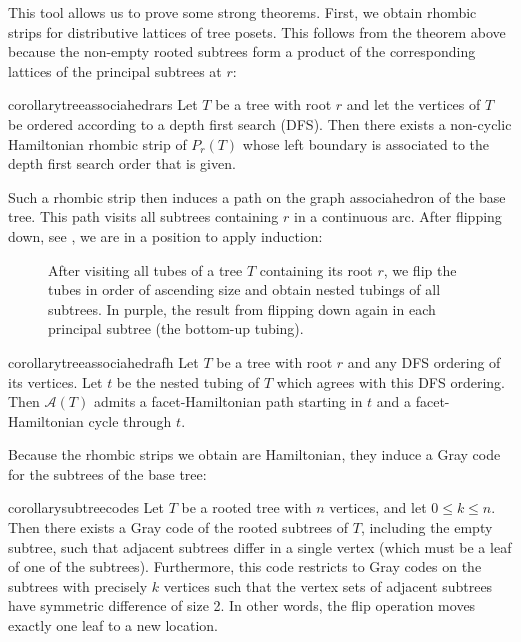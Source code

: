 \documentclass[fontsize=11pt,a4paper,DIV=12]{scrartcl}
\begin{document}
This tool allows us to prove some strong theorems. First, we obtain rhombic strips for distributive lattices of tree posets. This follows from the theorem above because the non-empty rooted subtrees form a product of the corresponding lattices of the principal subtrees at $r$:

\begin{restatable}{corollary}{treeassociahedrars}\label{thm:tree associahedra rs}
	Let $T$ be a tree with root $r$ and let the vertices of $T$ be ordered according to a depth first search (DFS). Then there exists a non-cyclic Hamiltonian rhombic strip of $P_r(T)$ whose left boundary is associated to the depth first search order that is given.
\end{restatable}

Such a rhombic strip then induces a path on the graph associahedron of the base tree. This path visits all subtrees containing $r$ in a continuous arc. After flipping down, see , we are in a position to apply induction:

\begin{figure}
	\centering
	
	\caption{After visiting all tubes of a tree $T$ containing its root $r$, we flip the tubes in order of ascending size and obtain nested tubings of all subtrees. In purple, the result from flipping down again in each principal subtree (the bottom-up tubing).}
	\label{fig:tree flipping down}
\end{figure}

\begin{restatable}{corollary}{treeassociahedrafh}\label{thm:tree associahedra fh}
	Let $T$ be a tree with root $r$ and any DFS ordering of its vertices. Let $t$ be the nested tubing of $T$ which agrees with this DFS ordering. Then $\mathcal{A}(T)$ admits a facet-Hamiltonian path starting in $t$ and a facet-Hamiltonian cycle through $t$.
\end{restatable}

Because the rhombic strips we obtain are Hamiltonian, they induce a Gray code for the subtrees of the base tree:

\begin{restatable}{corollary}{subtreecodes}\label{thm:subtree gray code}
	Let $T$ be a rooted tree with $n$ vertices, and let $0\le k\le n$. Then there exists a Gray code of the rooted subtrees of $T$, including the empty subtree, such that adjacent subtrees differ in a single vertex (which must be a leaf of one of the subtrees). Furthermore, this code restricts to Gray codes on the subtrees with precisely $k$ vertices such that the vertex sets of adjacent subtrees have symmetric difference of size 2. In other words, the flip operation moves exactly one leaf to a new location.
\end{restatable}
\end{document}
